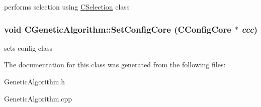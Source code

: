 \label{classCGeneticAlgorithm_a44c7a724b1af1370d1e669c84f30775f}
performs selection using \hyperlink{classCSelection}{CSelection} class \hypertarget{classCGeneticAlgorithm_aa3b7378230c783d13431d50eaf3600c9}{
\subsubsection[{SetConfigCore}]{\setlength{\rightskip}{0pt plus 5cm}void CGeneticAlgorithm::SetConfigCore ({\bf CConfigCore} $\ast$ {\em ccc})}}
\label{classCGeneticAlgorithm_aa3b7378230c783d13431d50eaf3600c9}
sets config class 

The documentation for this class was generated from the following files:\begin{DoxyCompactItemize}
\item 
GeneticAlgorithm.h\item 
GeneticAlgorithm.cpp\end{DoxyCompactItemize}
